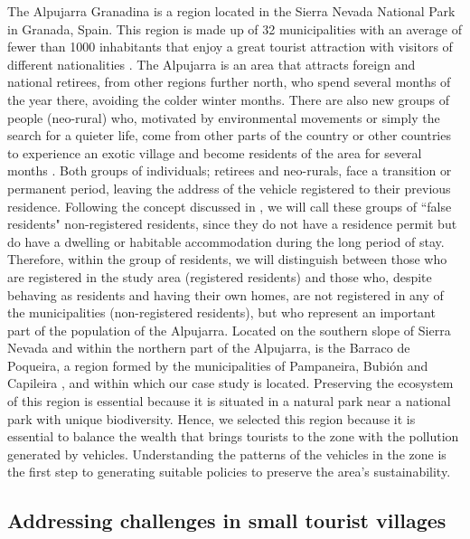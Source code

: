 The Alpujarra Granadina is a region located in the Sierra Nevada National Park in Granada, Spain. This region is made up of 32 municipalities with an average of fewer than 1000 inhabitants that enjoy a great tourist attraction with visitors of different nationalities \cite{escudero2018alpujarra}. The Alpujarra is an area that attracts foreign and national retirees, from other regions further north, who spend several months of the year there, avoiding the colder winter months. There are also new groups of people (neo-rural) who, motivated by environmental movements or simply the search for a quieter life, come from other parts of the country or other countries to experience an exotic village and become residents of the area for several months \cite{bertuglia2011reverse}. Both groups of individuals; retirees and neo-rurals, face a transition or permanent period, leaving the address of the vehicle registered to their previous residence. Following the concept discussed in \cite{rodriguez2004international}, we will call these groups of ``false residents" non-registered residents, since they do not have a residence permit but do have a dwelling or habitable accommodation during the long period of stay. Therefore, within the group of residents, we will distinguish between those who are registered in the study area (registered residents) and those who, despite behaving as residents and having their own homes, are not registered in any of the municipalities (non-registered residents), but who represent an important part of the population of the Alpujarra. Located on the southern slope of Sierra Nevada and within the northern part of the Alpujarra, is the Barraco de Poqueira, a region formed by the municipalities of Pampaneira, Bubión and Capileira \cite{escudero2018alpujarra}, and within which our case study is located. Preserving the ecosystem of this region is essential because it is situated in a natural park near a national park with unique biodiversity. Hence, we selected this region because it is essential to balance the wealth that brings tourists to the zone with the pollution generated by vehicles. Understanding the patterns of the vehicles in the zone is the first step to generating suitable policies to preserve the area's sustainability.

\subsection{Addressing challenges in small tourist villages}

